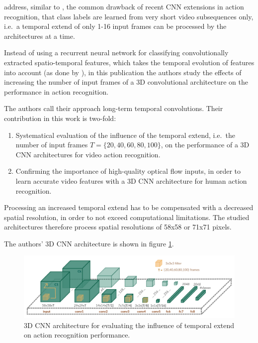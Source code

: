 \textcite{varol_long-term_2016} address, similar to \textcite{baccouche_sequential_2011}, the common drawback of recent CNN extensions in action recognition, that class labels are learned from very short video subsequences only, i.e.\ a temporal extend of only 1-16 input frames can be processed by the architectures at a time.\cite{ji_3d_2013}\cite{karpathy_large-scale_2014}\cite{tran_learning_2015}

Instead of using a recurrent neural network for classifying convolutionally extracted spatio-temporal features, which takes the temporal evolution of features into account (as done by \textcite{baccouche_sequential_2011}), in this publication the authors study the effects of increasing the number of input frames of a 3D convolutional architecture on the performance in action recognition.

The authors call their approach long-term temporal convolutions. Their contribution in this work is two-fold:
\begin{enumerate}
    \item Systematical evaluation of the influence of the temporal extend, i.e.\ the number of input frames $T = \{20, 40, 60, 80, 100\}$, on the performance of a 3D CNN architectures for video action recognition.  
    \item Confirming the importance of high-quality optical flow inputs, in order to learn accurate video features with a 3D CNN architecture for human action recognition.
\end{enumerate}

Processing an increased temporal extend has to be compensated with a decreased spatial resolution, in order to not exceed computational limitations.
The studied architectures therefore process spatial resolutions of 58x58 or 71x71 pixels.

The authors' 3D CNN architecture is shown in figure \ref{fig:longterm_architecture}.

\begin{figure}[H]
    \centering
    \includegraphics[width=\textwidth]{img_deep/longterm_architecture}
    \caption{3D CNN architecture for evaluating the influence of temporal extend on action recognition performance. \cite{varol_long-term_2016}}
    \label{fig:longterm_architecture}
\end{figure}

